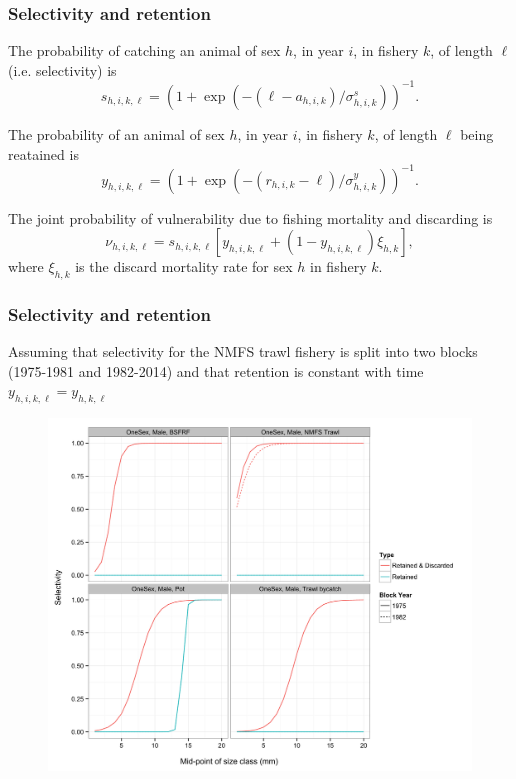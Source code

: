 \documentclass{beamer}
\begin{document}

\begin{frame}
\frametitle{Selectivity and retention}

The probability of catching an animal of sex $h$, in year $i$, in fishery $k$,
of length $\ell$ (i.e. selectivity) is
\begin{equation*}
  s_{h,i,k,\ell} = (1 + \exp(-(\ell-a_{h,i,k})/\sigma_{h,i,k}^s))^{-1}.
\end{equation*}

The probability of an animal of sex $h$, in year $i$, in fishery $k$, of length
$\ell$ being reatained is
\begin{equation*}
  y_{h,i,k,\ell} = (1 + \exp(-(r_{h,i,k}-\ell)/\sigma_{h,i,k}^y))^{-1}.
\end{equation*}

The joint probability of vulnerability due to fishing mortality and discarding
is
\begin{equation*}
  \nu_{h,i,k,\ell} = s_{h,i,k,\ell} \left[ y_{h,i,k,\ell} + (1 - y_{h,i,k,\ell})
    \xi_{h,k} \right],
\end{equation*}
where $\xi_{h,k}$ is the discard mortality rate for sex $h$ in fishery
$k$.
\end{frame}


\begin{frame}
\frametitle{Selectivity and retention}
Assuming that selectivity for the NMFS trawl fishery is split into two blocks
(1975-1981 and 1982-2014) and that retention is constant with time
$y_{h,i,k,\ell} = y_{h,k,\ell}$
\begin{figure}[!htbp]
  \centering
  \includegraphics[width=0.6\linewidth]{../../examples/bbrkc/OneSex/figure/selectivity.png}
\end{figure}
\end{frame}
\end{document}

